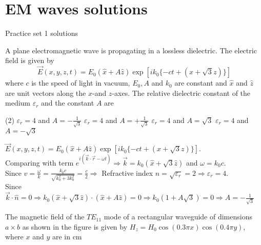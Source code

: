 \chapter{EM waves solutions}
\begin{abox}
	Practice set 1 solutions
	\end{abox}
\begin{enumerate}
\begin{minipage}{\textwidth}
	\item A plane electromagnetic wave is propagating in a lossless dielectric. The electric field is given by
	$$
	\vec{E}(x, y, z, t)=E_{0}(\hat{x}+A \hat{z}) \exp \left[i k_{0}\{-c t+(x+\sqrt{3} z)\}\right]
	$$
	where $c$ is the speed of light in vacuum, $E_{0}, A$ and $k_{0}$ are constant and $\hat{x}$ and $\hat{z}$ are unit vectors along the $x$-and $z$-axes. The relative dielectric constant of the medium $\varepsilon_{r}$ and the constant $A$ are
\end{minipage}
\begin{tasks}(2)
	\task[\textbf{A.}]$\varepsilon_{r}=4$ and $A=-\frac{1}{\sqrt{3}}$
	\task[\textbf{B.}]$\varepsilon_{r}=4$ and $A=+\frac{1}{\sqrt{3}}$
	\task[\textbf{C.}]$\varepsilon_{r}=4$ and $A=\sqrt{3}$
	\task[\textbf{D.}]$\varepsilon_{r}=4$ and $A=-\sqrt{3}$
\end{tasks}
\begin{answer}
	$\vec{E}(x, y, z, t)=E_{0}(\hat{x}+A \hat{z}) \exp \left[i k_{0}\{-c t+(x+\sqrt{3} z)\}\right]$.\\
	Comparing with term $e^{i(\vec{k} \cdot \vec{r}-\omega t)} \Rightarrow \vec{k}=k_{0}(\hat{x}+\sqrt{3} \hat{z})$ and $\omega=k_{0} c .$\\
	Since $v=\frac{\omega}{k}=\frac{k_{0} c}{\sqrt{k_{0}^{2}+3 k_{0}^{2}}}=\frac{c}{2} \Rightarrow$ Refractive index $n=\sqrt{\varepsilon_{r}}=2 \Rightarrow \varepsilon_{r}=4$.\\
	Since $\vec{k} \cdot \hat{n}=0 \Rightarrow k_{0}(\hat{x}+\sqrt{3} \hat{z}) \cdot(\hat{x}+A \hat{z})=0 \Rightarrow k_{0}(1+A \sqrt{3})=0 \Rightarrow A=-\frac{1}{\sqrt{3}}$	
\end{answer}
\begin{minipage}{\textwidth}
	\item The magnetic field of the $T E_{11}$ mode of a rectangular waveguide of dimensions $a \times b$ as shown in the figure is given by $H_{z}=H_{0} \cos (0.3 \pi x) \cos (0.4 \pi y)$, where $x$ and $y$ are in cm
	\begin{figure}[H]
		\centering

\end{figure}
\end{minipage}
\end{enumerate}
